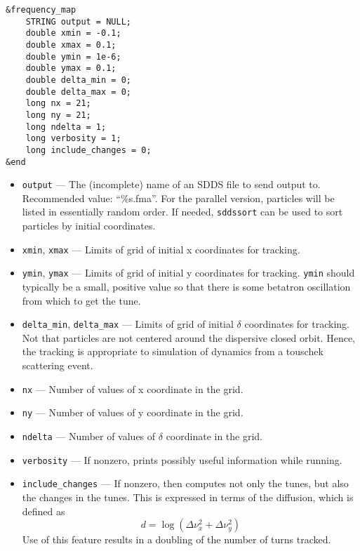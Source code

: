 \documentclass[11pt]{article}
\begin{document}
\begin{verbatim}
&frequency_map
    STRING output = NULL;
    double xmin = -0.1;
    double xmax = 0.1;
    double ymin = 1e-6;
    double ymax = 0.1;
    double delta_min = 0;
    double delta_max = 0;
    long nx = 21;
    long ny = 21;
    long ndelta = 1;
    long verbosity = 1;
    long include_changes = 0;
&end
\end{verbatim}

\begin{itemize}
\item \verb|output| --- The (incomplete) name of an SDDS file to send output to.  
 Recommended value: ``\%s.fma''.  For the parallel version, particles will be listed in essentially
 random order.  If needed, \verb|sddssort| can be used to sort particles by initial coordinates.
\item \verb|xmin|, \verb|xmax| --- Limits of grid of initial x coordinates for tracking.             
\item \verb|ymin|, \verb|ymax| --- Limits of grid of initial y coordinates for tracking.             
 \verb|ymin| should typically be a small, positive value so that there                               
 is some betatron oscillation from which to get the tune.                      
\item \verb|delta_min|, \verb|delta_max| --- Limits of grid of initial $\delta$ coordinates
for tracking.  Not that particles are not centered around the dispersive closed orbit.  Hence,
the tracking is appropriate to simulation of dynamics from a touschek scattering event.
\item \verb|nx| --- Number of values of x coordinate in the grid.
\item \verb|ny| --- Number of values of y coordinate in the grid.
\item \verb|ndelta| --- Number of values of $\delta$ coordinate in the grid.
\item \verb|verbosity| --- If nonzero, prints possibly useful information while running.
\item \verb|include_changes| --- If nonzero, then computes not only the tunes, but also
        the changes in the tunes.  This is expressed in terms of the diffusion, which is defined
        as 
\begin{equation}
  d = \log \left(\Delta\nu_x^2 + \Delta\nu_y^2\right)
\end{equation}
Use of this feature results in a doubling of the number of turns tracked.
\end{itemize}
\end{document}
